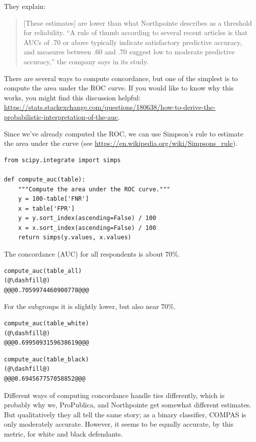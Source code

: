 They explain:

\begin{quote}
{[}These estimates{]} are lower than what Northpointe describes as a
threshold for reliability. ``A rule of thumb according to several recent
articles is that AUCs of .70 or above typically indicate satisfactory
predictive accuracy, and measures between .60 and .70 suggest low to
moderate predictive accuracy,'' the company says in its study.
\end{quote}

There are several ways to compute concordance, but one of the simplest
is to compute the area under the ROC curve. If you would like to know
why this works, you might find this discussion helpful:
\url{https://stats.stackexchange.com/questions/180638/how-to-derive-the-probabilistic-interpretation-of-the-auc}.

Since we've already computed the ROC, we can use Simpson's rule to
estimate the area under the curve (see
\url{https://en.wikipedia.org/wiki/Simpsons_rule}).

\begin{lstlisting}[]
from scipy.integrate import simps

def compute_auc(table):
    """Compute the area under the ROC curve."""
    y = 100-table['FNR']
    x = table['FPR']
    y = y.sort_index(ascending=False) / 100
    x = x.sort_index(ascending=False) / 100
    return simps(y.values, x.values)
\end{lstlisting}

The concordance (AUC) for all respondents is about 70\%.

\begin{lstlisting}[]
compute_auc(table_all)
(@\dashfill@)
@@@0.7059974460900778@@@
\end{lstlisting}

For the subgroups it is slightly lower, but also near 70\%.

\begin{lstlisting}[]
compute_auc(table_white)
(@\dashfill@)
@@@0.6995093159638619@@@
\end{lstlisting}

\begin{lstlisting}[]
compute_auc(table_black)
(@\dashfill@)
@@@0.694567757058852@@@
\end{lstlisting}

Different ways of computing concordance handle ties differently, which
is probably why we, ProPublica, and Northpointe get somewhat different
estimates. But qualitatively they all tell the same story; as a binary
classifier, COMPAS is only moderately accurate. However, it seems to be
equally accurate, by this metric, for white and black defendants.

